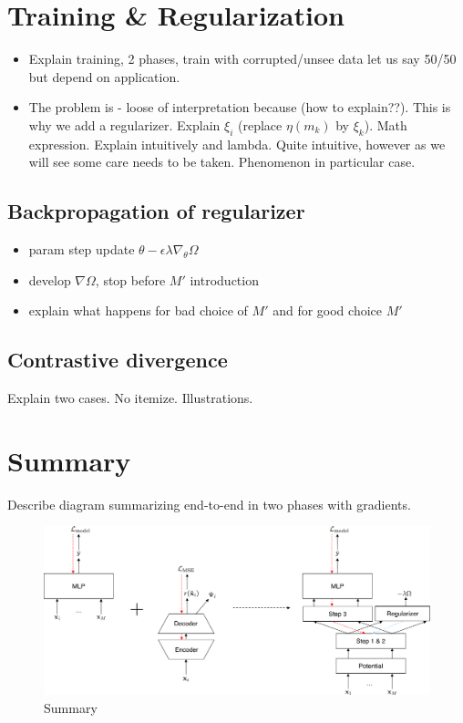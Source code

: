 
\section{Training \& Regularization}

\begin{itemize}
\item Explain training, 2 phases, train with corrupted/unsee data let us say 50/50 but depend on application.
\item The problem is - loose of interpretation because (how to explain??). This is why we add a regularizer. Explain $\xi_i$ (replace $\eta(m_k)$ by $\xi_k$). Math expression. Explain intuitively and lambda. Quite intuitive, however as we will see some care needs to be taken. Phenomenon in particular case.
\end{itemize}
\subsection*{Backpropagation of regularizer}
\begin{itemize}
\item param step update $\theta - \epsilon\lambda\nabla_\theta\Omega$
\item develop $\nabla\Omega$, stop before $M'$ introduction
\item explain what happens for bad choice of $M'$ and for good choice $M'$
\end{itemize}
\subsection*{Contrastive divergence}
Explain two cases. No itemize. Illustrations.



\section{Summary}

Describe diagram summarizing end-to-end in two phases with gradients. 
\begin{figure}[!h]
\centering
\includegraphics[scale=0.36]{figures/summary-training}
\caption{Summary}	
\label{fig:summary}
\end{figure}

